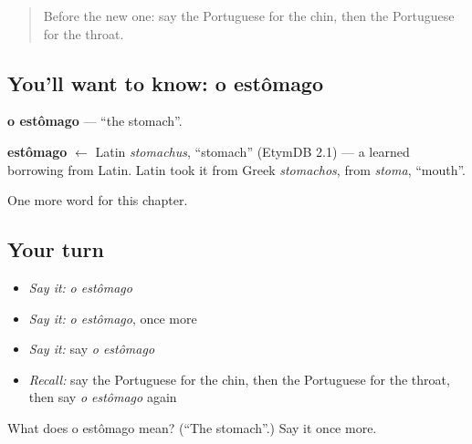 \begin{quote}
Before the new one: say the Portuguese for the chin, then the Portuguese for the throat.
\end{quote}

\subsection*{You'll want to know: o estômago}
\textbf{o estômago} — \textquotedblleft{}the stomach\textquotedblright{}.

\begin{cousinweb}
\textbf{estômago} $\leftarrow$ Latin \emph{stomachus}, \textquotedblleft{}stomach\textquotedblright{} (EtymDB 2.1) — a learned borrowing from Latin. Latin took it from Greek \emph{stomachos}, from \emph{stoma}, \textquotedblleft{}mouth\textquotedblright{}.
\end{cousinweb}

\begin{grammarlens}[title={What you've built}]
One more word for this chapter.
\end{grammarlens}

\subsection*{Your turn}
\begin{itemize}
\raggedright
  \item \emph{Say it:} \emph{o estômago}
  \item \emph{Say it:} \emph{o estômago}, once more
  \item \emph{Say it:} say \emph{o estômago}
  \item \emph{Recall:} say the Portuguese for the chin, then the Portuguese for the throat, then say \emph{o estômago} again
\end{itemize}

\begin{tcolorbox}[breakable,colback=teal!4,colframe=teal!35!black,title={Before you move on}]
What does o estômago mean? (\textquotedblleft{}The stomach\textquotedblright{}.) Say it once more.
\end{tcolorbox}
